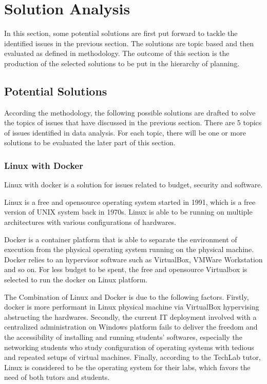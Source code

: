 
\section{Solution Analysis}

In this section, some potential solutions are first put forward to tackle the identified issues in the previous section. The solutions are topic based and then evaluated as defined in methodology. The outcome of this section is the production of the selected solutions to be put in the hierarchy of planning.

\subsection{Potential Solutions}

According the methodology, the following possible solutions are drafted to solve the topics of issues that have discussed in the previous section. There are 5 topics of issues identified in data analysis. For each topic, there will be one or more solutions to be evaluated the later part of this section.

\subsubsection{Linux with Docker}
Linux with docker is a solution for issues related to budget, security and software.

Linux is a free and opensource operating system started in 1991, which is a free version of UNIX system back in 1970s. Linux is able to be running on multiple architectures with various configurations of hardwares.

Docker is a container platform that is able to separate the environment of execution from the physical operating system running on the physical machine. Docker relies to an hypervisor software such as VirtualBox, VMWare Workstation and so on. For less budget to be spent, the free and opensource Virtualbox is selected to run the docker on Linux platform.

The Combination of Linux and Docker is due to the following factors. Firstly, docker is more performant in Linux physical machine via VirtualBox hypervising abstructing the hardwares. Secondly, the current IT deployment involved with a centralized administration on Windows platform fails to deliver the freedom  and the accessibility of installing and running students' softwares, especially the networking students who study configuration of operating systems with tedious and repeated setups of virtual machines. Finally, according to the TechLab tutor, Linux is considered to be the operating system for their labs, which favors the need of both tutors and students.

